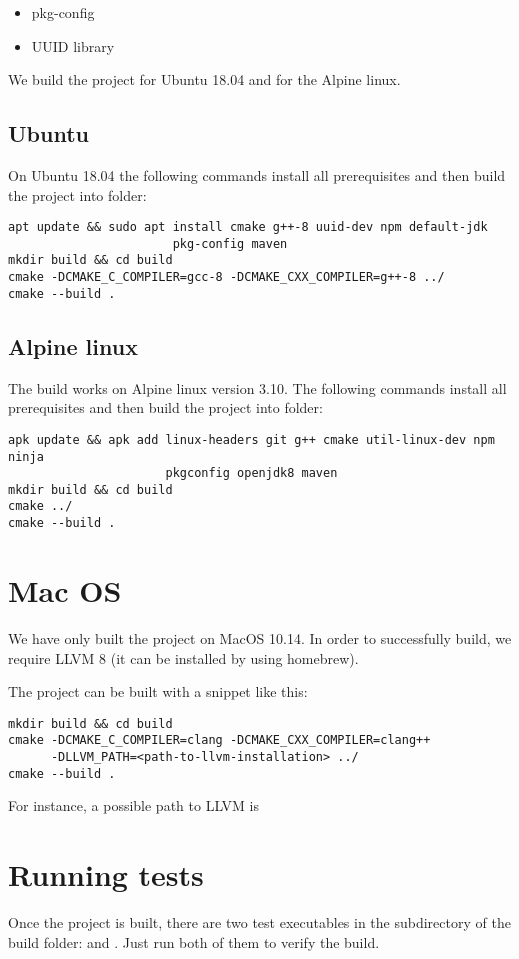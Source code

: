 \begin{itemize}
	\item pkg-config
	\item UUID library
\end{itemize}


We build the project for Ubuntu 18.04 and for the Alpine linux.
\subsection{Ubuntu}
On Ubuntu 18.04 the following commands install all prerequisites and then build the project into  folder:

\begin{verbatim}
apt update && sudo apt install cmake g++-8 uuid-dev npm default-jdk
                       pkg-config maven
mkdir build && cd build
cmake -DCMAKE_C_COMPILER=gcc-8 -DCMAKE_CXX_COMPILER=g++-8 ../
cmake --build .
\end{verbatim}


\subsection{Alpine linux}

The build works on Alpine linux version 3.10. The following commands install all prerequisites and then build the project into  folder:
\begin{verbatim}
apk update && apk add linux-headers git g++ cmake util-linux-dev npm ninja
                      pkgconfig openjdk8 maven
mkdir build && cd build
cmake ../
cmake --build .
\end{verbatim}


\section{Mac OS}
We have only built the project on MacOS 10.14. In order to successfully build, we require LLVM 8 (it can be installed by using homebrew).

The project can be built with a snippet like this:
\begin{verbatim}
mkdir build && cd build
cmake -DCMAKE_C_COMPILER=clang -DCMAKE_CXX_COMPILER=clang++
      -DLLVM_PATH=<path-to-llvm-installation> ../
cmake --build .
\end{verbatim}
For instance, a possible path to LLVM is 

\section{Running tests}
Once the project is built, there are two test executables in the  subdirectory of the build folder:  and . Just run both of them to verify the build.


